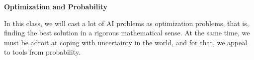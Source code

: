 \item {\bf Optimization and Probability}

In this class, we will cast a lot of AI problems as optimization problems, that is, finding the best solution in a rigorous mathematical sense. At the same time, we must be adroit at coping with uncertainty in the world, and for that, we appeal to tools from probability.

\begin{enumerate}

  

  

  

  

  

  

  

  

  

  

\end{enumerate}
